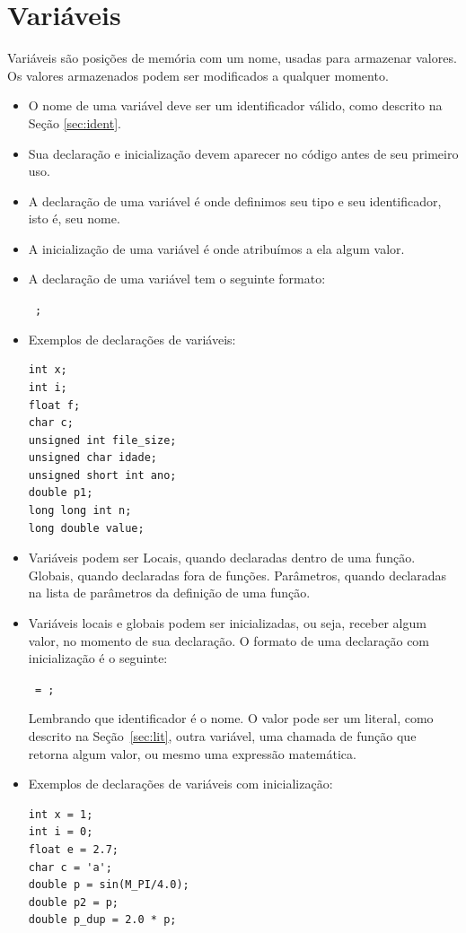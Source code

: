 \section{Variáveis}

Variáveis são posições de memória com um nome, usadas para armazenar valores. Os valores armazenados podem ser modificados a qualquer momento.

\begin{itemize}
\item O nome de uma variável deve ser um identificador válido, como descrito na Seção \ref{sec:ident}.
\item Sua declaração e inicialização devem aparecer no código antes de seu primeiro uso.
\item A declaração de uma variável é onde definimos seu tipo e seu identificador, isto é, seu nome.
\item A inicialização de uma variável é onde atribuímos a ela algum valor.
\item A declaração de uma variável tem o seguinte formato:

{\tt {} ;}

\item Exemplos de declarações de variáveis:
\begin{lstlisting}
int x;
int i;
float f;
char c;
unsigned int file_size;
unsigned char idade;
unsigned short int ano;
double p1;
long long int n;
long double value;
\end{lstlisting}


\item Variáveis podem ser
\subitem Locais, quando declaradas dentro de uma função.
\subitem Globais, quando declaradas fora de funções.
\subitem Parâmetros, quando declaradas na lista de parâmetros da definição de uma função.

\item Variáveis locais e globais podem ser inicializadas, ou seja, receber algum valor, no momento de sua declaração. O formato de uma declaração com inicialização é o seguinte:

{\tt {}  = ;}

Lembrando que identificador é o nome. O valor pode ser um literal, como descrito na Seção~\ref{sec:lit}, outra variável, uma chamada de função que retorna algum valor, ou mesmo uma expressão matemática.

\item Exemplos de declarações de variáveis com inicialização:
\begin{lstlisting}
int x = 1;
int i = 0;
float e = 2.7;
char c = 'a';
double p = sin(M_PI/4.0);
double p2 = p;
double p_dup = 2.0 * p;
\end{lstlisting}

\end{itemize}


